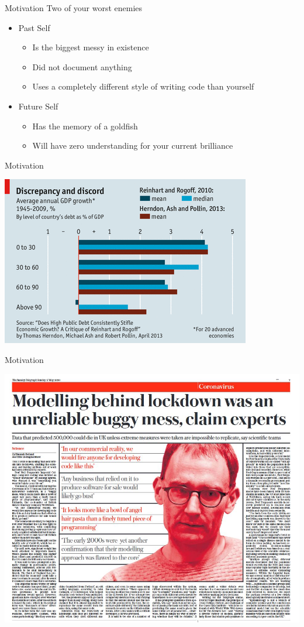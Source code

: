 \documentclass{beamer}\usepackage[]{graphicx}\usepackage[]{color}
\begin{document}
\begin{frame}{Motivation}
	Two of your worst enemies
	\begin{itemize}
			\item Past Self
			\begin{itemize}
			  \item Is the biggest messy in existence
			  \item Did not document anything
			  \item Uses a completely different style of writing code than yourself
			\end{itemize}
			\item Future Self
			\begin{itemize}
			  \item Has the memory of a goldfish
			  \item Will have zero understanding for your current brilliance
			\end{itemize}
	\end{itemize}
\end{frame}

\begin{frame}{Motivation}
\begin{center}
\includegraphics[width=.75\textwidth]{reinhart_rogoff.PNG}
\end{center}
\end{frame}


\begin{frame}{Motivation}
\begin{center}
\includegraphics[width=.75\textwidth]{bad_code_media.JPG}
\end{center}
\end{frame}
\end{document}
